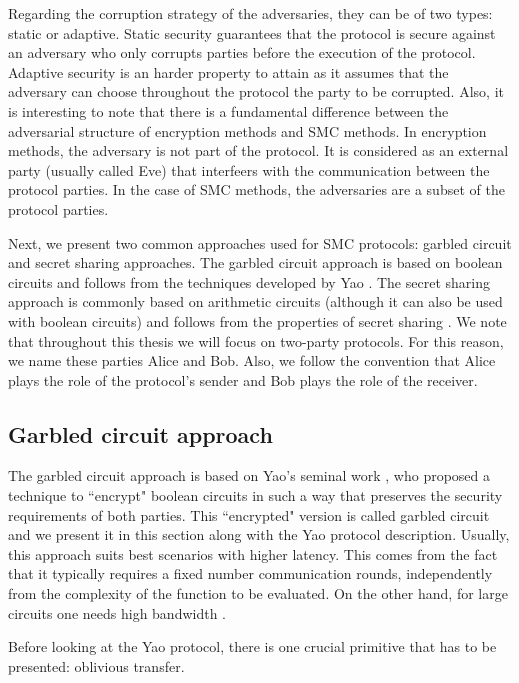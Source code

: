 Regarding the corruption strategy of the adversaries, they can be of two types: static or adaptive. Static security guarantees that the protocol is secure against an adversary who only corrupts parties before the execution of the protocol. Adaptive security is an harder property to attain as it assumes that the adversary can choose throughout the protocol the party to be corrupted. Also, it is interesting to note that there is a fundamental difference between the adversarial structure of encryption methods and SMC methods. In encryption methods, the adversary is not part of the protocol. It is considered as an external party (usually called Eve) that interfeers with the communication between the protocol parties. In the case of SMC methods, the adversaries are a subset of the protocol parties.

Next, we present two common approaches used for SMC protocols: garbled circuit and secret sharing approaches. The garbled circuit approach is based on boolean circuits and follows from the techniques developed by Yao \cite{Yao82}. The secret sharing approach is commonly based on arithmetic circuits (although it can also be used with boolean circuits) and follows from the properties of secret sharing \cite{BGW88, CCD88}. We note that throughout this thesis we will focus on two-party protocols. For this reason, we name these parties Alice and Bob. Also, we follow the convention that Alice plays the role of the protocol's sender and Bob plays the role of the receiver. 

\subsection{Garbled circuit approach}

The garbled circuit approach is based on Yao's seminal work \cite{Yao82}, who proposed a technique to ``encrypt" boolean circuits in such a way that preserves the security requirements of both parties. This ``encrypted" version is called garbled circuit and we present it in this section along with the Yao protocol description. Usually, this approach suits best scenarios with higher latency. This comes from the fact that it typically requires a fixed number communication rounds, independently from the complexity of the function to be evaluated. On the other hand, for large circuits one needs high bandwidth \cite{PWM+20}.

Before looking at the Yao protocol, there is one crucial primitive that has to be presented: oblivious transfer.

